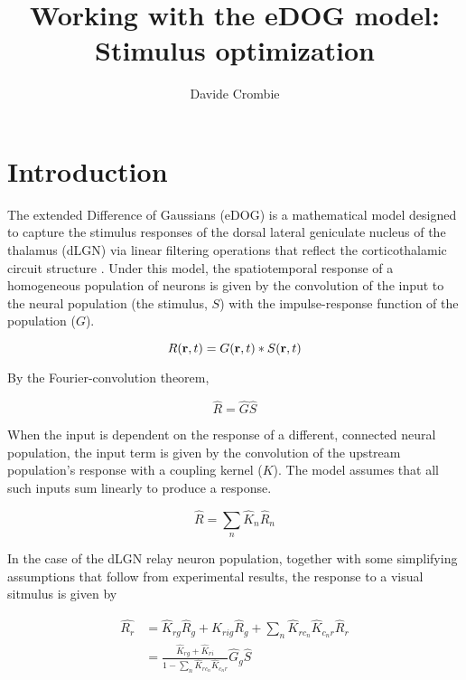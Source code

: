 \documentclass{article}
\title{Working with the eDOG model: Stimulus optimization}
\author{Davide Crombie}
\newcommand{\vect}[1]{\textbf{\textrm{#1}}}
\begin{document}
\maketitle

\section{Introduction} \label{introduction}
The extended Difference of Gaussians (eDOG) is a mathematical model designed to capture the stimulus responses of the dorsal lateral geniculate nucleus of the thalamus (dLGN) via linear filtering operations that reflect the corticothalamic circuit structure \citep{einevoll2012, mobarhan2018}.
Under this model, the spatiotemporal response of a homogeneous population of neurons is given by the convolution of the input to the neural population (the stimulus, $S$) with the impulse-response function of the population ($G$).

\begin{equation} \label{impulseresp}
	R(\vect{r},t) = G(\vect{r},t)*S(\vect{r},t)
\end{equation}

By the Fourier-convolution theorem,

\begin{equation*}
	\hat{R} = \hat{G}\hat{S}
\end{equation*}

When the input is dependent on the response of a different, connected neural population, the input term is given by the convolution of the upstream population's response with a coupling kernel ($K$). 
The  model assumes that all such inputs sum linearly to produce a response.

\begin{equation*}
	\hat{R} = \sum_n{\hat{K}_n\hat{R}_n}
\end{equation*}

In the case of the dLGN relay neuron population, together with some simplifying assumptions that follow from experimental results, the response to a visual sitmulus is given by

\begin{align} \label{edog}
	\hat{R_r} & = \hat{K}_{rg}\hat{R}_g + \hat{K}_{rig}\hat{R}_g + 
				  \sum_n{\hat{K}_{rc_n}\hat{K}_{c_nr}\hat{R}_r} \nonumber \\
			  & = \frac{\hat{K}_{rg} + \hat{K}_{ri}}{1 - 
			  	  \sum_n{\hat{K}_{rc_n}\hat{K}_{c_nr}}} \hat{G}_g\hat{S} 
\end{align}
\end{document}
